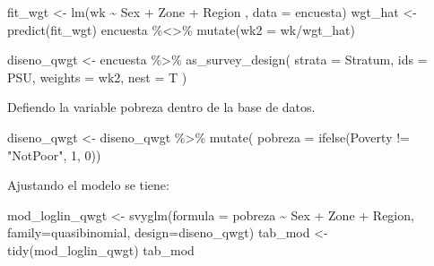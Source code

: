 \documentclass[
  12pt,
]{book}
\newenvironment{Shaded}{\begin{snugshade}}{\end{snugshade}}
\newcommand{\AttributeTok}[1]{\textcolor[rgb]{0.77,0.63,0.00}{#1}}
\newcommand{\DecValTok}[1]{\textcolor[rgb]{0.00,0.00,0.81}{#1}}
\newcommand{\FunctionTok}[1]{\textcolor[rgb]{0.00,0.00,0.00}{#1}}
\newcommand{\NormalTok}[1]{#1}
\newcommand{\OtherTok}[1]{\textcolor[rgb]{0.56,0.35,0.01}{#1}}
\newcommand{\SpecialCharTok}[1]{\textcolor[rgb]{0.00,0.00,0.00}{#1}}
\newcommand{\StringTok}[1]{\textcolor[rgb]{0.31,0.60,0.02}{#1}}
\begin{document}
\begin{Shaded}
\begin{Highlighting}[]
\NormalTok{  fit\_wgt }\OtherTok{\textless{}{-}} \FunctionTok{lm}\NormalTok{(wk }\SpecialCharTok{\textasciitilde{}}\NormalTok{  Sex }\SpecialCharTok{+}\NormalTok{ Zone }\SpecialCharTok{+}\NormalTok{ Region ,}
                \AttributeTok{data =}\NormalTok{ encuesta)}
\NormalTok{  wgt\_hat }\OtherTok{\textless{}{-}} \FunctionTok{predict}\NormalTok{(fit\_wgt)}
\NormalTok{  encuesta }\SpecialCharTok{\%\textless{}\textgreater{}\%} \FunctionTok{mutate}\NormalTok{(}\AttributeTok{wk2 =}\NormalTok{ wk}\SpecialCharTok{/}\NormalTok{wgt\_hat)}
  
\NormalTok{  diseno\_qwgt }\OtherTok{\textless{}{-}}\NormalTok{ encuesta }\SpecialCharTok{\%\textgreater{}\%}
    \FunctionTok{as\_survey\_design}\NormalTok{(}
      \AttributeTok{strata =}\NormalTok{ Stratum,}
      \AttributeTok{ids =}\NormalTok{ PSU,}
      \AttributeTok{weights =}\NormalTok{ wk2,}
      \AttributeTok{nest =}\NormalTok{ T}
\NormalTok{    )}
\end{Highlighting}
\end{Shaded}

Defiendo la variable pobreza dentro de la base de datos.

\begin{Shaded}
\begin{Highlighting}[]
\NormalTok{diseno\_qwgt }\OtherTok{\textless{}{-}}\NormalTok{ diseno\_qwgt }\SpecialCharTok{\%\textgreater{}\%} \FunctionTok{mutate}\NormalTok{(}
\AttributeTok{pobreza =} \FunctionTok{ifelse}\NormalTok{(Poverty }\SpecialCharTok{!=} \StringTok{"NotPoor"}\NormalTok{, }\DecValTok{1}\NormalTok{, }\DecValTok{0}\NormalTok{))}
\end{Highlighting}
\end{Shaded}

Ajustando el modelo se tiene:

\begin{Shaded}
\begin{Highlighting}[]
\NormalTok{mod\_loglin\_qwgt }\OtherTok{\textless{}{-}} \FunctionTok{svyglm}\NormalTok{(}\AttributeTok{formula =}\NormalTok{ pobreza }\SpecialCharTok{\textasciitilde{}}\NormalTok{ Sex }\SpecialCharTok{+}\NormalTok{ Zone }\SpecialCharTok{+}\NormalTok{ Region,}
                          \AttributeTok{family=}\NormalTok{quasibinomial,}
                          \AttributeTok{design=}\NormalTok{diseno\_qwgt)}
\NormalTok{tab\_mod }\OtherTok{\textless{}{-}} \FunctionTok{tidy}\NormalTok{(mod\_loglin\_qwgt)}
\NormalTok{tab\_mod}
\end{Highlighting}
\end{Shaded}
\end{document}
